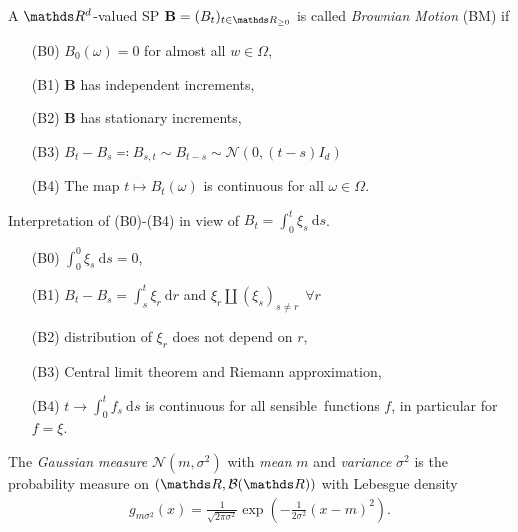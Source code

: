 \documentclass[10pt,a4paper]{report}
\begin{document}
\begin{defi}
A $\Rd$-valued SP $\textbf{B}=(B_t)_{t \in \R_{\geq 0}}$ is called \emph{Brownian Motion} (BM) if 
\begin{enumerate}
\item[(B0)] $B_0(\omega)=0$ for almost all $w\in \Omega$,
\item[(B1)] $\textbf{B}$ has independent increments,
\item[(B2)] $\textbf{B}$ has stationary increments,
\item[(B3)] $B_t-B_s\eqqcolon B_{s,t}\sim B_{t-s}\sim \mathcal{N}(0,(t-s)I_d)$
\item[(B4)] The map $t\mapsto B_t(\omega)$ is continuous for all $\omega \in \Omega$.
\end{enumerate}
\end{defi}

\begin{bem}
Interpretation of (B0)-(B4) in view of $B_t=\int_0^t \xi_s~\mathrm{d}s$.
\begin{enumerate}
\item[(B0)] $\int_0^0\xi_s~\mathrm{d}s=0$,
\item[(B1)] $B_t-B_s=\int_s^t \xi_r~\mathrm{d}r$ and $\xi_r \amalg (\xi_s)_{s\not =r}~~\forall r$
\item[(B2)] distribution of $\xi_r$ does not depend on $r$,
\item[(B3)] Central limit theorem and Riemann approximation,
\item[(B4)] $t\to \int_0^t f_s~\mathrm{d}s$ is continuous for all \glqq sensible\grqq\, functions $f$, in particular for $f=\xi$.
\end{enumerate}
\end{bem}

\begin{defi}
The \emph{Gaussian measure} $\mathcal{N}(m,\sigma^2)$ with \emph{mean} $m$ and \emph{variance} $\sigma^2$ is the probability measure on
$(\R,\mathcal{B}(\R))$ with Lebesgue density
\begin{align*}
g_{m\sigma^2}(x)=\frac{1}{\sqrt{2\pi \sigma^2}} \exp\left(-\frac{1}{2\sigma^2}(x-m)^2\right).
\end{align*}
\end{defi}
\end{document}
